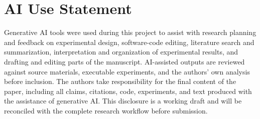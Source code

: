 \section*{AI Use Statement}
Generative AI tools were used during this project to assist with research planning and feedback on experimental design, software-code editing, literature search and summarization, interpretation and organization of experimental results, and drafting and editing parts of the manuscript. AI-assisted outputs are reviewed against source materials, executable experiments, and the authors' own analysis before inclusion. The authors take responsibility for the final content of the paper, including all claims, citations, code, experiments, and text produced with the assistance of generative AI. This disclosure is a working draft and will be reconciled with the complete research workflow before submission.
